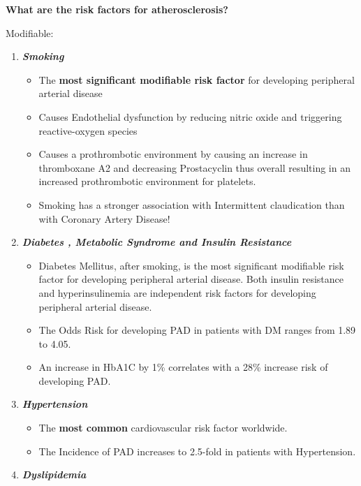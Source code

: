 \documentclass[
]{book}
\begin{document}
\textbf{What are the risk factors for atherosclerosis?}

Modifiable:

\begin{enumerate}
\def\labelenumi{\arabic{enumi}.}
\item
  \textbf{\emph{Smoking}}

  \begin{itemize}
  \item
    The \textbf{most significant modifiable risk factor} for developing
    peripheral arterial disease
  \item
    Causes Endothelial dysfunction by reducing nitric oxide and
    triggering reactive-oxygen species
    \citep{unitedstatessurgeongeneralHealthConsequencesSmoking2014}
  \item
    Causes a prothrombotic environment by causing an increase in
    thromboxane A2 and decreasing Prostacyclin thus overall
    resulting in an increased prothrombotic environment for
    platelets.
  \item
    Smoking has a stronger association with Intermittent
    claudication than with Coronary Artery Disease!
    \citep{gordonPredispositionAtherosclerosisHead1972}
  \end{itemize}
\item
  \textbf{\emph{Diabetes , Metabolic Syndrome and Insulin Resistance}}

  \begin{itemize}
  \item
    Diabetes Mellitus, after smoking, is the most significant
    modifiable risk factor for developing peripheral arterial
    disease. Both insulin resistance and hyperinsulinemia are
    independent risk factors for developing peripheral arterial
    disease.
  \item
    The Odds Risk for developing PAD in patients with DM ranges from
    1.89 to 4.05.
  \item
    An increase in HbA1C by 1\% correlates with a 28\% increase risk
    of developing PAD. \citep{adlerUKPDS59Hyperglycemia2002}
  \end{itemize}
\item
  \textbf{\emph{Hypertension}}

  \begin{itemize}
  \item
    The \textbf{most common} cardiovascular risk factor worldwide.
  \item
    The Incidence of PAD increases to 2.5-fold in patients with
    Hypertension. \citep{kannelUpdateEpidemiologicFeatures1985}
  \end{itemize}
\item
  \textbf{\emph{Dyslipidemia}}


\end{enumerate}
\end{document}
